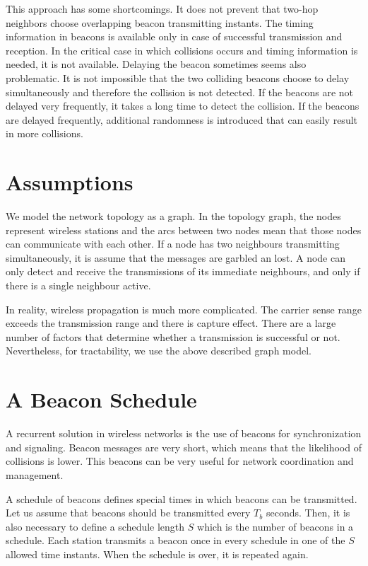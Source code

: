 \documentclass[journal]{IEEEtran}
\begin{document}
This approach has some shortcomings. 
It does not prevent that two-hop neighbors choose overlapping beacon transmitting instants.
The timing information in beacons is available only in case of successful transmission and reception.
In the critical case in which collisions occurs and timing information is needed, it is not available.
Delaying the beacon sometimes seems also problematic. 
It is not impossible that the two colliding beacons choose to delay simultaneously and therefore the collision is not detected.
If the beacons are not delayed very frequently, it takes a long time to detect the collision.
If the beacons are delayed frequently, additional randomness is introduced that can easily result in more collisions.

\section{Assumptions}
We model the network topology as a graph.
In the topology graph, the nodes represent wireless stations and the arcs between two nodes mean that those nodes can communicate with each other.
If a node has two neighbours transmitting simultaneously, it is assume that the messages are garbled an lost.
A node can only detect and receive the transmissions of its immediate neighbours, and only if there is a single neighbour active.

In reality, wireless propagation is much more complicated.
The carrier sense range exceeds the transmission range and there is capture effect.
There are a large number of factors that determine whether a transmission is successful or not.
Nevertheless, for tractability, we use the above described graph model.

\section{A Beacon Schedule}
A recurrent solution in wireless networks is the use of beacons for synchronization and signaling.
Beacon messages are very short, which means that the likelihood of collisions is lower.
This beacons can be very useful for network coordination and management.

A schedule of beacons defines special times in which beacons can be transmitted.
Let us assume that beacons should be transmitted every $T_b$ seconds.
Then, it is also necessary to define a schedule length $S$ which is the number of beacons in a schedule.
Each station transmits a beacon once in every schedule in one of the $S$ allowed time instants.
When the schedule is over, it is repeated again.
\end{document}
